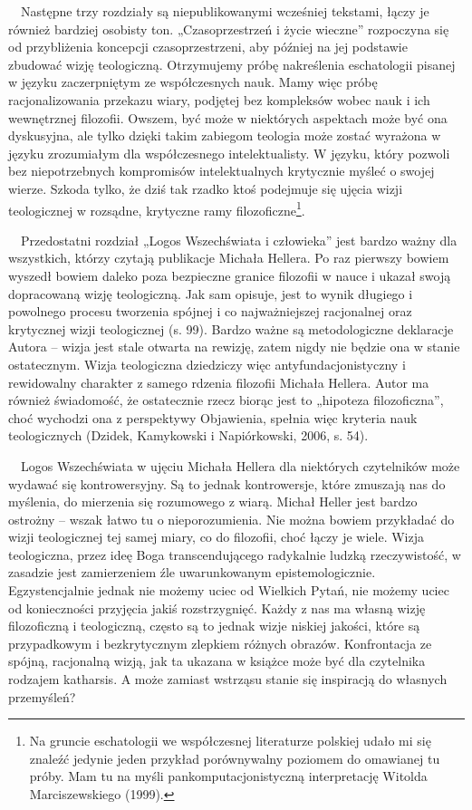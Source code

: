 \documentclass[a4paper]{article}
\begin{document}
\ \ Następne trzy rozdziały są niepublikowanymi wcześniej tekstami, łączy je również bardziej osobisty ton.
„Czasoprzestrzeń i życie wieczne” rozpoczyna się od przybliżenia koncepcji czasoprzestrzeni, aby później na jej
podstawie zbudować wizję teologiczną. Otrzymujemy próbę nakreślenia eschatologii pisanej w języku zaczerpniętym ze
współczesnych nauk. Mamy więc próbę racjonalizowania przekazu wiary, podjętej bez kompleksów wobec nauk i ich
wewnętrznej filozofii. Owszem, być może w niektórych aspektach może być ona dyskusyjna, ale tylko dzięki takim zabiegom
teologia może zostać wyrażona w języku zrozumiałym dla współczesnego intelektualisty. W języku, który pozwoli bez
niepotrzebnych kompromisów intelektualnych krytycznie myśleć o swojej wierze. Szkoda tylko, że dziś tak rzadko ktoś
podejmuje się ujęcia wizji teologicznej w rozsądne, krytyczne ramy filozoficzne\footnote{Na gruncie eschatologii we
współczesnej literaturze polskiej udało mi się znaleźć jedynie jeden przykład porównywalny poziomem do omawianej tu
próby. Mam tu na myśli pankomputacjonistyczną interpretację Witolda Marciszewskiego (1999).}.  

\ \ Przedostatni rozdział „Logos Wszechświata i człowieka” jest bardzo ważny dla wszystkich, którzy czytają publikacje
Michała Hellera. Po raz pierwszy bowiem wyszedł bowiem daleko poza bezpieczne granice filozofii w nauce i ukazał swoją
dopracowaną wizję teologiczną. Jak sam opisuje, jest to wynik długiego i powolnego procesu tworzenia spójnej i co
najważniejszej racjonalnej oraz krytycznej wizji teologicznej (s. 99). Bardzo ważne są metodologiczne deklaracje Autora
– wizja jest stale otwarta na rewizję, zatem nigdy nie będzie ona w stanie ostatecznym. Wizja teologiczna dziedziczy
więc antyfundacjonistyczny i rewidowalny charakter z samego rdzenia filozofii Michała Hellera. Autor ma również
świadomość, że ostatecznie rzecz biorąc jest to „hipoteza filozoficzna”, choć wychodzi ona z perspektywy Objawienia,
spełnia więc kryteria nauk teologicznych (Dzidek, Kamykowski i Napiórkowski, 2006, s. 54).

\ \ Logos Wszechświata w ujęciu Michała Hellera dla niektórych czytelników może wydawać się kontrowersyjny. Są to jednak
kontrowersje, które zmuszają nas do myślenia, do mierzenia się rozumowego z wiarą. Michał Heller jest bardzo ostrożny –
wszak łatwo tu o nieporozumienia. Nie można bowiem przykładać do wizji teologicznej tej samej miary, co do filozofii,
choć łączy je wiele. Wizja teologiczna, przez ideę Boga transcendującego radykalnie ludzką rzeczywistość, w zasadzie
jest zamierzeniem źle uwarunkowanym epistemologicznie. Egzystencjalnie jednak nie możemy uciec od Wielkich Pytań, nie
możemy uciec od konieczności przyjęcia jakiś rozstrzygnięć. Każdy z nas ma własną wizję filozoficzną i teologiczną,
często są to jednak wizje niskiej jakości, które są przypadkowym i bezkrytycznym zlepkiem różnych obrazów. Konfrontacja
ze spójną, racjonalną wizją, jak ta ukazana w książce może być dla czytelnika rodzajem katharsis. A może zamiast
wstrząsu stanie się inspiracją do własnych przemyśleń?
\end{document}
